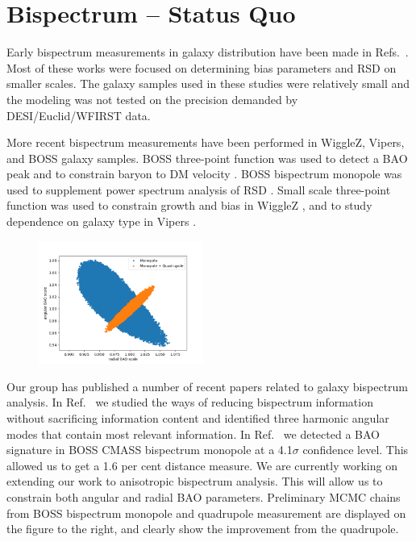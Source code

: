 \section{Bispectrum -- Status Quo}
\label{sec:statusquo}
Early bispectrum measurements in galaxy distribution have been made in
Refs.~\cite{2014ApJ...780..139G,2011ApJ...739...85M,2011ApJ...726...13M,2009MNRAS.399..801G,2007MNRAS.378.1196K,2006MNRAS.368.1507N,2005MNRAS.364..620G,2005MNRAS.361..824G,2004PASJ...56..415K,2004ApJ...607..140J,2002MNRAS.335..432V,1975ApJ...196....1P}.
Most of these works were focused on determining bias parameters and RSD on
smaller scales. The galaxy samples used in these studies were relatively small
and the modeling was not tested on the precision demanded by DESI/Euclid/WFIRST
data.

More recent bispectrum measurements have been performed in WiggleZ, Vipers, and
BOSS galaxy samples. BOSS three-point function was used to detect a BAO peak
\cite{2017MNRAS.469.1738S} and to constrain baryon to DM velocity
\cite{2016arXiv160706098S}. BOSS bispectrum monopole was used to supplement
power spectrum analysis of RSD
\cite{2017MNRAS.465.1757G,2015MNRAS.452.1914G,2015MNRAS.451..539G}. Small scale
three-point function was used to constrain growth and bias in WiggleZ
\cite{2013MNRAS.432.2654M}, and to study dependence on galaxy type in Vipers
\cite{2017A&A...604A.133M}.

\begin{figure}
\begin{center}
\includegraphics[width=0.48\textwidth]{prelimMCMC.png}
\end{center}
\end{figure}

Our group has published a number of recent papers related to galaxy bispectrum
analysis. In Ref.~\cite{2017MNRAS.467..928G} we studied the ways of reducing
bispectrum information without sacrificing information content and identified
three harmonic angular modes that contain most relevant information. In
Ref.~\cite{2018MNRAS.478.4500P} we detected a BAO signature in BOSS CMASS
bispectrum monopole at a 4.1$\sigma$ confidence level. This allowed us to
get a 1.6 per cent distance measure. We are currently working on extending our
work to anisotropic bispectrum analysis. This will allow us to constrain both
angular and radial BAO parameters. Preliminary MCMC chains from BOSS bispectrum
monopole and quadrupole measurement are displayed on the figure to the right,
and clearly show the improvement from the quadrupole.

